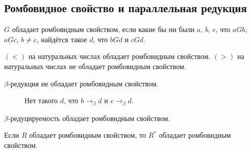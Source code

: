 \subsection{\texorpdfstring{Ромбовидное свойство и параллельная редукция}{Diamond property and parallel reduction}}

\begin{definition}
    $G$ обладает ромбовидным свойством, если какие бы ни были $a$, $b$, $c$, что $aGb$, $aGc$, $b \ne c$, найдётся такое $d$, что $bGd$ и $cGd$.
\end{definition}

\begin{example}
    $(<)$ на натуральных числах обладает ромбовидным свойством.
    $(>)$ на натуральных числах не обладает ромбовидным свойством.

$\beta$-редукция не обладает ромбовидным свойством.
\begin{figure}[h]
    \centering
    \caption{Нет такого $d$, что $b \rightarrow_{\beta} d$ и $c \rightarrow_{\beta} d$.}
\end{figure}
\end{example}

\begin{theorem} \label{church-rosser}
    $\beta$-редуцируемость обладает ромбовидным свойством.
\end{theorem}

\begin{lemma}
    Если $R$ обладает ромбовидным свойством, то $R^{*}$ обладает ромбовидным свойством.
\end{lemma}

